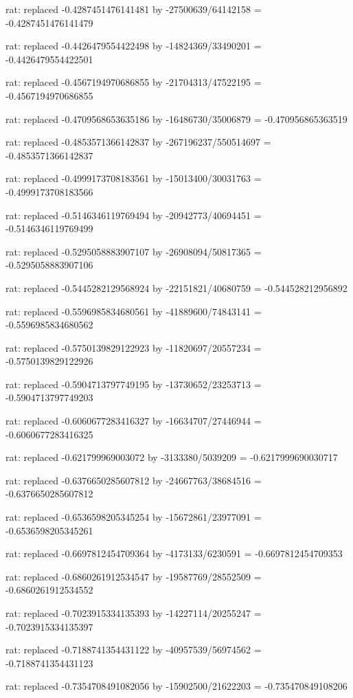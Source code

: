 \documentclass[a4paper,10pt]{article}
\begin{document}
\begin{eulernotebook}
\begin{eulercomment}
\begin{eulercomment}
\begin{eulercomment}
\begin{eulercomment}
\begin{eulercomment}
\begin{eulercomment}
\begin{eulercomment}
\begin{eulercomment}
\begin{eulercomment}
\begin{eulercomment}
\begin{eulercomment}
\begin{eulercomment}
\begin{eulercomment}
\begin{eulercomment}
\begin{eulercomment}
\begin{eulercomment}
\begin{euleroutput}
  rat: replaced -0.4287451476141481 by -27500639/64142158 = -0.4287451476141479
  
  rat: replaced -0.4426479554422498 by -14824369/33490201 = -0.4426479554422501
  
  rat: replaced -0.4567194970686855 by -21704313/47522195 = -0.4567194970686855
  
  rat: replaced -0.4709568653635186 by -16486730/35006879 = -0.470956865363519
  
  rat: replaced -0.4853571366142837 by -267196237/550514697 = -0.4853571366142837
  
  rat: replaced -0.4999173708183561 by -15013400/30031763 = -0.4999173708183566
  
  rat: replaced -0.5146346119769494 by -20942773/40694451 = -0.5146346119769499
  
  rat: replaced -0.5295058883907107 by -26908094/50817365 = -0.5295058883907106
  
  rat: replaced -0.5445282129568924 by -22151821/40680759 = -0.544528212956892
  
  rat: replaced -0.5596985834680561 by -41889600/74843141 = -0.5596985834680562
  
  rat: replaced -0.5750139829122923 by -11820697/20557234 = -0.5750139829122926
  
  rat: replaced -0.5904713797749195 by -13730652/23253713 = -0.5904713797749203
  
  rat: replaced -0.6060677283416327 by -16634707/27446944 = -0.6060677283416325
  
  rat: replaced -0.621799969003072 by -3133380/5039209 = -0.6217999690030717
  
  rat: replaced -0.6376650285607812 by -24667763/38684516 = -0.6376650285607812
  
  rat: replaced -0.6536598205345254 by -15672861/23977091 = -0.6536598205345261
  
  rat: replaced -0.6697812454709364 by -4173133/6230591 = -0.6697812454709353
  
  rat: replaced -0.6860261912534547 by -19587769/28552509 = -0.6860261912534552
  
  rat: replaced -0.7023915334135393 by -14227114/20255247 = -0.7023915334135397
  
  rat: replaced -0.7188741354431122 by -40957539/56974562 = -0.7188741354431123
  
  rat: replaced -0.7354708491082056 by -15902500/21622203 = -0.735470849108206
  

\end{euleroutput}
\end{eulercomment}
\end{eulercomment}
\end{eulercomment}
\end{eulercomment}
\end{eulercomment}
\end{eulercomment}
\end{eulercomment}
\end{eulercomment}
\end{eulercomment}
\end{eulercomment}
\end{eulercomment}
\end{eulercomment}
\end{eulercomment}
\end{eulercomment}
\end{eulercomment}
\end{eulercomment}
\end{eulernotebook}
\end{document}
